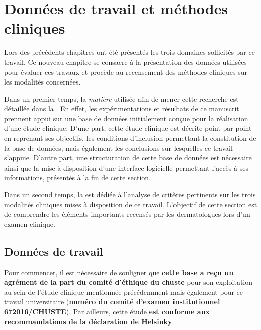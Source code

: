 \renewcommand{\thechapter}{\arabic{chapter}}
\setcounter{chapter}{3}

\chapter{Données de travail et méthodes cliniques}
\label{chap:chapter_4}
\chapterintro
Lors des précédents chapitres ont été présentés les trois domaines sollicités par ce travail. Ce nouveau chapitre se consacre à la présentation des données utilisées pour évaluer ces travaux et procède au recensement des méthodes cliniques sur les modalités concernées.\par

Dans un premier temps, la \textit{matière} utilisée afin de mener cette recherche est détaillée dans la . En effet, les expérimentations et résultats de ce manuscrit prennent appui sur une base de données initialement conçue pour la réalisation d'une étude clinique.  D’une part, cette étude clinique est décrite point par point en reprenant ses objectifs, les conditions d'inclusion permettant la constitution de la base de données, mais également les conclusions sur lesquelles ce travail s'appuie. D’autre part, une structuration de cette base de données est nécessaire ainsi que la mise à disposition d’une interface logicielle permettant l’accès à ses informations, présentés à la fin de cette section.\par

Dans un second temps, la  est dédiée à l’analyse de critères pertinents sur les trois modalités cliniques mises à disposition de ce travail. L'objectif de cette section est de comprendre les éléments importants recensés par les dermatologues lors d'un examen clinique.\par
\newpage

\section{Données de travail}
\label{sec:clinical_data}
Pour commencer, il est nécessaire de souligner que \textbf{cette base a reçu un agrément de la part du comité d'éthique du \acrfull{chuste}} pour son exploitation au sein de l'étude clinique mentionnée précédemment mais également pour ce travail universitaire (\textbf{numéro du comité d'examen institutionnel 672016/CHUSTE}). Par ailleurs, cette étude \textbf{est conforme aux recommandations de la déclaration de Helsinky}.\par

